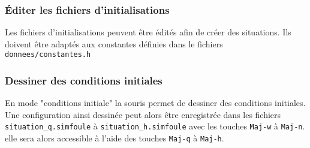 \subsubsection{Éditer les fichiers d'initialisations}
Les fichiers d'initialisations peuvent être édités afin de créer des situations. Ils doivent être adaptés aux constantes définies dans le fichiers \texttt{donnees/constantes.h}
%
\subsubsection{Dessiner des conditions initiales}
En mode "conditions initiale" la souris permet de dessiner des conditions initiales. Une configuration ainsi dessinée peut alors être enregistrée dans les fichiers \texttt{situation\_q.simfoule} à \texttt{situation\_h.simfoule} avec les touches \texttt{Maj-w} à \texttt{Maj-n}. elle sera alors accessible à l'aide des touches \texttt{Maj-q} à \texttt{Maj-h}.











